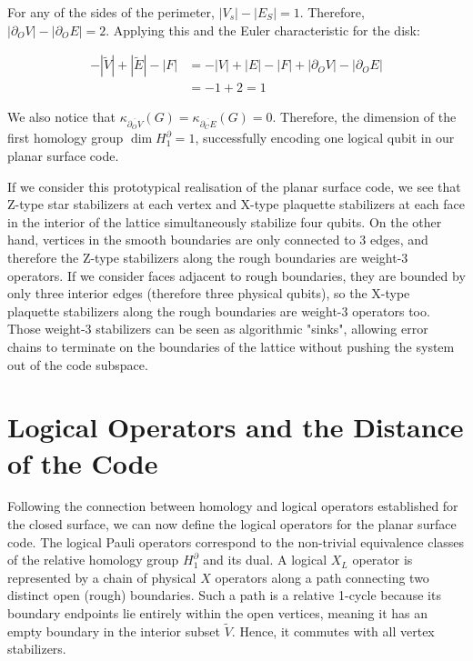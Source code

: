 \documentclass[12pt, twoside, openany]{book}
\begin{document}
For any of the sides of the perimeter, $|V_s| - |E_S| = 1$. Therefore, $|\partial_O V| - |\partial_O E| = 2$. Applying this and the Euler characteristic for the disk:

\begin{align*}
    -|\tilde{V}| + |\tilde{E}| - |F| &= -|V| + |E| - |F| + |\partial_O V| - |\partial_O E|\\
    &=-1+2 = 1
\end{align*}

We also notice that $\kappa_{\overline{\partial_O V}}(G) = \kappa_{\overline{\partial_C E}}(G) = 0$. Therefore, the dimension of the first homology group $\dim H_1 ^\partial = 1$, successfully encoding one logical qubit in our planar surface code. 

If we consider this prototypical realisation of the planar surface code, we see that Z-type star stabilizers at each vertex and X-type plaquette stabilizers at each face in the interior of the lattice simultaneously stabilize four qubits. On the other hand, vertices in the smooth boundaries are only connected to 3 edges, and therefore the Z-type stabilizers along the rough boundaries are weight-3 operators. If we consider faces adjacent to rough boundaries, they are bounded by only three interior edges (therefore three physical qubits), so the X-type plaquette stabilizers along the rough boundaries are weight-3 operators too. Those weight-3 stabilizers can be seen as algorithmic "sinks", allowing error chains to terminate on the boundaries of the lattice without pushing the system out of the code subspace. \\


\section{Logical Operators and the Distance of the Code}

Following the connection between homology and logical operators established for the closed surface, we can now define the logical operators for the planar surface code. The logical Pauli operators correspond to the non-trivial equivalence classes of the relative homology group $H_1^\partial$ and its dual. A logical $X_L$ operator is represented by a chain of physical $X$ operators along a path connecting two distinct open (rough) boundaries. Such a path is a relative 1-cycle because its boundary endpoints lie entirely within the open vertices, meaning it has an empty boundary in the interior subset $\tilde{V}$. Hence, it commutes with all vertex stabilizers. 
\end{document}
